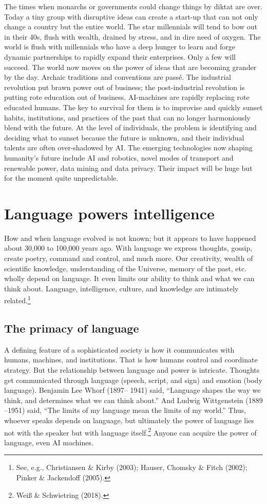 \begin{multicols}{2}
The times when monarchs or governments could change things by diktat are over. Today a tiny group with disruptive ideas can create a start-up that can not only change a country but the entire world. The star millennials will tend to bow out in their 40s, flush with wealth, drained by stress, and in dire need of oxygen. The world is flush with millennials who have a deep hunger to learn and forge dynamic partnerships to rapidly expand their enterprises. Only a few will succeed. The world now moves on the power of ideas that are becoming grander by the day. Archaic traditions and conventions are passé. The industrial revolution put brawn power out of business; the post-industrial revolution is putting rote education out of business. AI-machines are rapidly replacing rote educated humans. The key to survival for them is to improvise and quickly sunset habits, institutions, and practices of the past that can no longer harmoniously blend with the future. At the level of individuals, the problem is identifying and deciding what to sunset because the future is unknown, and their individual talents are often over-shadowed by AI. The emerging technologies now shaping humanity's future include AI and robotics, novel modes of transport and renewable power, data mining and data privacy. Their impact will be huge but for the moment quite unpredictable.

\section{Language powers intelligence}

How and when language evolved is not known; but it appears to have happened about 30,000 to 100,000 years ago. With language we express thoughts, gossip, create poetry, command and control, and much more. Our creativity, wealth of scientific knowledge, understanding of the Universe, memory of the past, etc. wholly depend on language. It even limits our ability to think and what we can think about. Language, intelligence, culture, and knowledge are intimately related.\footnote{See, e.g., Christiansen \& Kirby (2003); Hauser, Chomsky \& Fitch (2002); Pinker \& Jackendoff (2005).}

\subsection*{The primacy of language}

A defining feature of a sophisticated society is how it communicates with humans, machines, and institutions. That is how humans control and coordinate strategy. But the relationship between language and power is intricate. Thoughts get communicated through language (speech, script, and sign) and emotion (body language). Benjamin Lee Whorf (1897– 1941) said, “Language shapes the way we think, and determines what we can think about.” And Ludwig Wittgenstein (1889 –1951) said, “The limits of my language mean the limits of my world.” Thus, whoever speaks depends on language, but ultimately the power of language lies not with the speaker but with language itself.\footnote{Weiß \& Schwietring (2018).}  Anyone can acquire the power of language, even AI machines.


\end{multicols}
